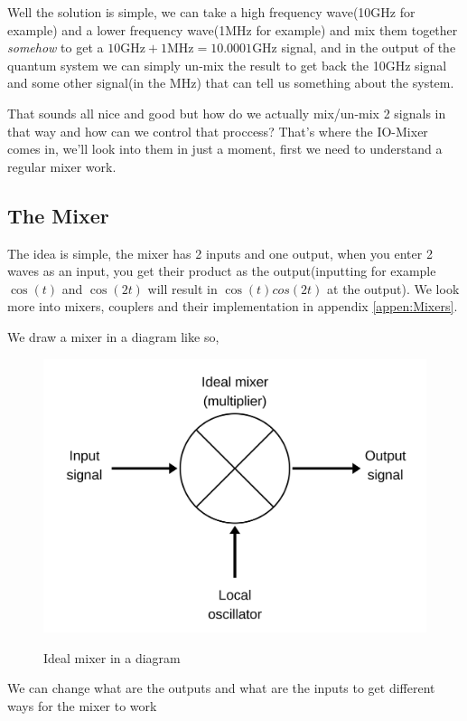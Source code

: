 \documentclass[english, a4paper, 12pt, twoside]{article}
\numberwithin{equation}{section} %
\begin{document}
Well the solution is simple, we can take a high frequency wave(10GHz for example) and a lower frequency wave(1MHz for example) and mix them together \textit{somehow} to get a $10\text{GHz} + 1\text{MHz} = 10.0001\text{GHz}$ signal, and in the output of the quantum system we can simply un-mix the result to get back the 10GHz signal and some other signal(in the MHz) that can tell us something about the system.

That sounds all nice and good but how do we actually mix/un-mix 2 signals in that way and how can we control that proccess? That's where the IO-Mixer comes in, we'll look into them in just a moment, first we need to understand a regular mixer work.

\subsection{The Mixer}
The idea is simple, the mixer has 2 inputs and one output, when you enter 2 waves as an input, you get their product as the output(inputting for example $\cos(t)$ and $\cos(2t)$ will result in $\cos(t)cos(2t)$ at the output). We look more into mixers, couplers and their implementation in appendix \ref{appen:Mixers}.

We draw a mixer in a diagram like so,

\begin{figure}[H]
    \centering
    \caption{Ideal mixer in a diagram}
    \includegraphics[width=0.3\columnwidth]{Ideal-Mixer.png} %
    \label{fig:Ideal-Mixer}
\end{figure}
We can change what are the outputs and what are the inputs to get different ways for the mixer to work %
\end{document}
